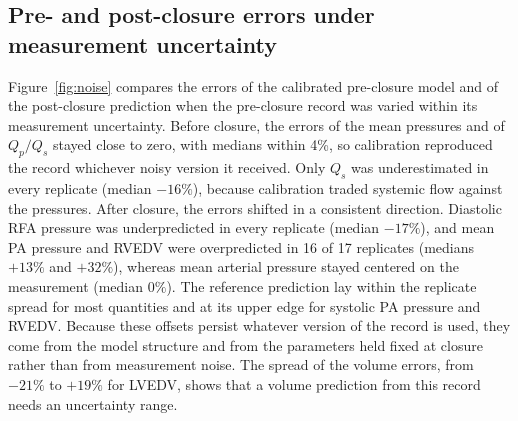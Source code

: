 \subsection{Pre- and post-closure errors under measurement uncertainty}
\label{sec:disc_noise}
Figure~\ref{fig:noise} compares the errors of the calibrated pre-closure model and of the post-closure prediction when the pre-closure record was varied within its measurement uncertainty. Before closure, the errors of the mean pressures and of $Q_p/Q_s$ stayed close to zero, with medians within 4\%, so calibration reproduced the record whichever noisy version it received. Only $Q_s$ was underestimated in every replicate (median $-16\%$), because calibration traded systemic flow against the pressures. After closure, the errors shifted in a consistent direction. Diastolic RFA pressure was underpredicted in every replicate (median $-17\%$), and mean PA pressure and RVEDV were overpredicted in 16 of 17 replicates (medians $+13\%$ and $+32\%$), whereas mean arterial pressure stayed centered on the measurement (median $0\%$). The reference prediction lay within the replicate spread for most quantities and at its upper edge for systolic PA pressure and RVEDV. Because these offsets persist whatever version of the record is used, they come from the model structure and from the parameters held fixed at closure rather than from measurement noise. The spread of the volume errors, from $-21\%$ to $+19\%$ for LVEDV, shows that a volume prediction from this record needs an uncertainty range.

